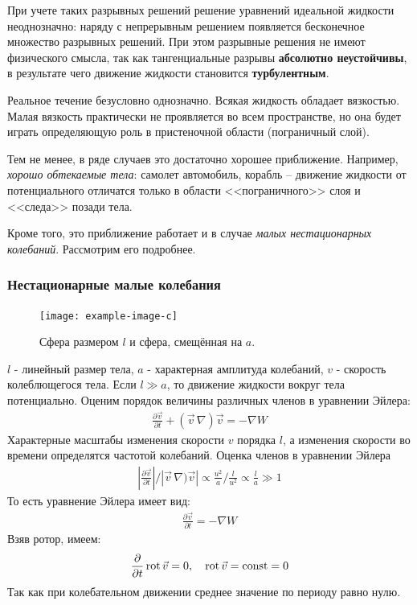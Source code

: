 При учете таких разрывных решений решение уравнений идеальной жидкости неоднозначно: наряду с непрерывным решением появляется бесконечное множество разрывных решений. При этом разрывные решения не имеют физического смысла, так как тангенциальные разрывы \textbf{абсолютно неустойчивы}, в результате чего движение жидкости становится \textbf{турбулентным}.

Реальное течение безусловно однозначно. Всякая жидкость обладает вязкостью. Малая вязкость практически не проявляется во всем пространстве, но она будет играть определяющую роль в пристеночной области (пограничный слой).

Тем не менее, в ряде случаев это достаточно хорошее приближение.  Например, \textit{хорошо обтекаемые тела}: самолет автомобиль, корабль -- движение жидкости от потенциального отличатся только в области <<пограничного>> слоя и <<следа>> позади тела.

Кроме того, это приближение работает и в случае \textit{малых нестационарных колебаний}. Рассмотрим его подробнее.


\subsubsection{Нестационарные малые колебания}
\begin{figure}[H]
	\centering
	\texttt{[image: example-image-c]}
	\caption{Сфера размером $l$ и сфера, смещённая на $a$.}
	\label{fig:figure15}
\end{figure}
$l$ - линейный размер тела, $a$ - характерная амплитуда колебаний, $v$ - скорость колеблющегося тела. Если $l \gg a$, то движение жидкости вокруг тела потенциально. Оценим порядок величины различных членов в уравнении Эйлера:
\begin{align*}
\frac { \partial \vec{v} } { \partial t } + ( \vec{v}\,\nabla ) \vec{v} = - \nabla W
\end{align*}
Характерные масштабы изменения скорости $v$ порядка $l$, а изменения скорости во времени определятся частотой колебаний. Оценка членов в уравнении Эйлера
\begin{align*}
\left| \frac { \partial \vec{v} } { \partial t } \right| / \left| \vec{v}\,\nabla ) \vec{v} \right| \propto \frac { u ^ { 2 } } { a } / \frac { l } { u ^ { 2 } } \propto \frac { l } { a } \gg 1
\end{align*}
То есть уравнение Эйлера имеет вид:
\begin{align*}
\frac { \partial \vec{v} } { \partial t } = - \nabla W
\end{align*}
Взяв ротор, имеем:
\begin{align*}
\pdv{t}  \operatorname{rot}  \vec{v} = 0 , \quad\operatorname{rot}\vec{v} = \operatorname { const } = 0
\end{align*}
Так как при колебательном движении среднее значение по периоду равно нулю.

